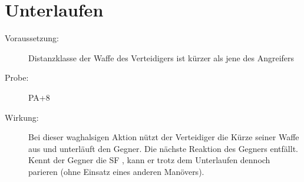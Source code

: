\section{Unterlaufen}
\label{bPA.unterlaufen}
\begin{description}
    \item[Voraussetzung:]
        Distanzklasse der Waffe des Verteidigers ist kürzer als jene des Angreifers
    \item[Probe:]
        PA+8
    \item[Wirkung:]
        Bei dieser waghalsigen Aktion nützt der Verteidiger die Kürze seiner Waffe aus und unterläuft den Gegner.
        Die nächste Reaktion des Gegners entfällt.
        Kennt der Gegner die SF , kann er trotz dem Unterlaufen dennoch parieren (ohne Einsatz eines anderen Manövers).
\end{description}
